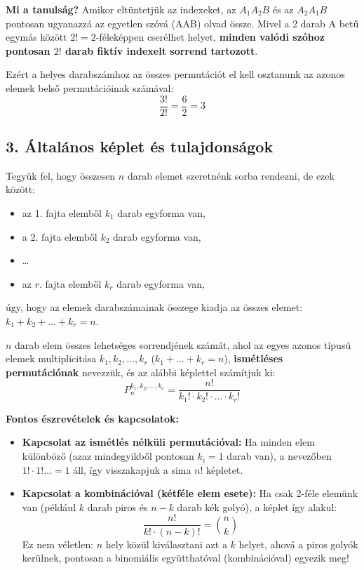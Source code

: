 \documentclass[11pt, a4paper]{article}
\begin{document}
\vspace{0.2cm}
\noindent\textbf{Mi a tanulság?}
Amikor eltüntetjük az indexeket, az $A_1 A_2 B$ és az $A_2 A_1 B$ pontosan ugyanazzá az egyetlen szóvá (AAB) olvad össze. Mivel a 2 darab A betű egymás között $2! = 2$-féleképpen cserélhet helyet, \textbf{minden valódi szóhoz pontosan $2!$ darab fiktív indexelt sorrend tartozott}.

Ezért a helyes darabszámhoz az összes permutációt el kell osztanunk az azonos elemek belső permutációinak számával:
\[
\frac{3!}{2!} = \frac{6}{2} = 3
\]

\subsection*{3. Általános képlet és tulajdonságok}
Tegyük fel, hogy összesen $n$ darab elemet szeretnénk sorba rendezni, de ezek között:
\begin{itemize}
    \item az 1. fajta elemből $k_1$ darab egyforma van,
    \item a 2. fajta elemből $k_2$ darab egyforma van,
    \item \dots
    \item az $r$. fajta elemből $k_r$ darab egyforma van,
\end{itemize}
úgy, hogy az elemek darabszámainak összege kiadja az összes elemet: $k_1 + k_2 + \ldots + k_r = n$.

\vspace{0.2cm}
\begin{tcolorbox}[colback=blue!5!white, colframe=blue!75!black, title=\textbf{Definíció és képlet (Ismétléses permutáció)}]
$n$ darab elem összes lehetséges sorrendjének számát, ahol az egyes azonos típusú elemek multiplicitása $k_1, k_2, \ldots, k_r$ ($k_1 + \dots + k_r = n$), \textbf{ismétléses permutációnak} nevezzük, és az alábbi képlettel számítjuk ki:
\[
P_n^{k_1, k_2, \ldots, k_r} = \frac{n!}{k_1! \cdot k_2! \cdot \ldots \cdot k_r!}
\]
\end{tcolorbox}

\vspace{0.2cm}
\noindent\textbf{Fontos észrevételek és kapcsolatok:}
\begin{itemize}
    \item \textbf{Kapcsolat az ismétlés nélküli permutációval:} Ha minden elem különböző (azaz mindegyikből pontosan $k_i = 1$ darab van), a nevezőben $1! \cdot 1! \dots = 1$ áll, így visszakapjuk a sima $n!$ képletet.
    \item \textbf{Kapcsolat a kombinációval (kétféle elem esete):} Ha csak 2-féle elemünk van (például $k$ darab piros és $n - k$ darab kék golyó), a képlet így alakul:
    \[
    \frac{n!}{k! \cdot (n - k)!} = \binom{n}{k}
    \]
    Ez nem véletlen: $n$ hely közül kiválasztani azt a $k$ helyet, ahová a piros golyók kerülnek, pontosan a binomiális együtthatóval (kombinációval) egyezik meg!
\end{itemize}
\end{document}
